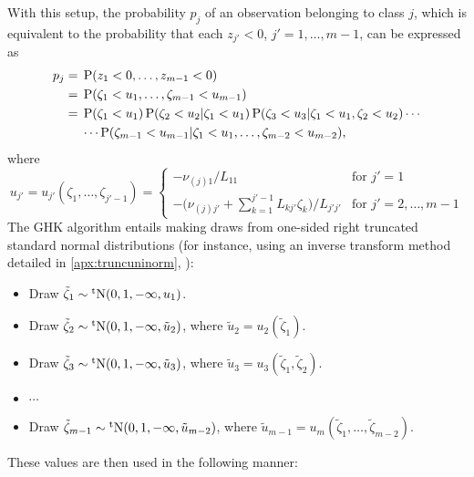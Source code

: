 With this setup, the probability $p_{j}$ of an observation belonging to class $j$, which is equivalent to the probability that each $ z_{j'} < 0$, $j'=1,\dots,m-1$, can be expressed as
\begin{align*}
  p_j 
  ={}& \operatorname{P}( z_1 < 0,\dots, z_{m-1} < 0) \\
  ={}& 
  \operatorname{P}(\zeta_1 < u_1,\dots,\zeta_{m-1}<u_{m-1}) \\
  ={}& 
  \operatorname{P}(\zeta_1 < u_1)
  \operatorname{P}(\zeta_2 < u_2|\zeta_1 < u_1)
  \operatorname{P}(\zeta_3 < u_3|\zeta_1 < u_1,\zeta_2 < u_2)
  \cdots \\
  &\cdots
  \operatorname{P}(\zeta_{m-1}<u_{m-1}|\zeta_1 < u_1,\dots,\zeta_{m-2}<u_{m-2}),
\end{align*}
where 
\begin{equation*}
  u_{j'} = 
  u_{j'}(\zeta_1,\dots,\zeta_{j'-1}) =
  \begin{cases}
    - \nu_{(j)1} / L_{11} &\text{for } j' = 1 \\
    - \big(\nu_{(j)j'} + \sum_{k=1}^{j'-1} L_{kj'}\zeta_k \big) / L_{j'j'} &\text{for } j' = 2,\dots,m-1
  \end{cases}
\end{equation*}
The GHK algorithm entails making draws from one-sided right truncated standard normal distributions (for instance, using an inverse transform method detailed in \cref{apx:truncuninorm},  ):
\begin{itemize}
  \item Draw $\tilde\zeta_1 \sim \operatorname{{}^tN}(0,1,-\infty,u_1)$.
  \item Draw $\tilde\zeta_2 \sim \operatorname{{}^tN}(0,1,-\infty,\tilde u_2)$, where $\tilde u_2 = u_2(\tilde\zeta_1)$.
  \item Draw $\tilde\zeta_3 \sim \operatorname{{}^tN}(0,1,-\infty,\tilde u_3)$, where $\tilde u_3 = u_3(\tilde\zeta_1,\tilde\zeta_2)$. 
  \item $\cdots$
  \item Draw $\tilde\zeta_{m-1} \sim \operatorname{{}^tN}(0,1,-\infty,\tilde u_{m-2})$, where $\tilde u_{m-1} = u_m(\tilde\zeta_1,\dots,\tilde\zeta_{m-2})$.
\end{itemize}
These values are then used in the following manner:
